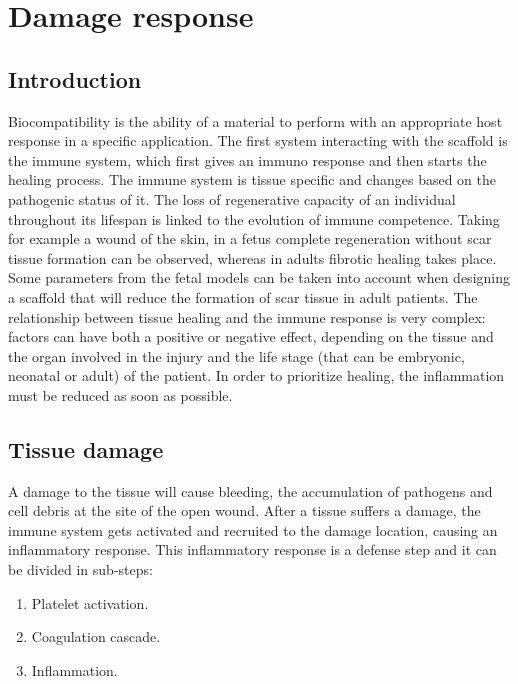 \graphicspath{{chapters/04/images/}}
\chapter{Damage response}

\section{Introduction}
Biocompatibility is the ability of a material to perform with an appropriate host response in a specific application.
The first system interacting with the scaffold is the immune system, which first gives an immuno response and then starts the healing process.
The immune system is tissue specific and changes based on the pathogenic status of it.
The loss of regenerative capacity of an individual throughout its lifespan is linked to the evolution of immune competence.
Taking for example a wound of the skin, in a fetus complete regeneration without scar tissue formation can be observed, whereas in adults fibrotic healing takes place.
Some parameters from the fetal models can be taken into account when designing a scaffold that will reduce the formation of scar tissue in adult patients.
The relationship between tissue healing and the immune response is very complex: factors can have both a positive or negative effect, depending on the tissue and the organ involved in the injury and the life stage (that can be embryonic, neonatal or adult) of the patient.
In order to prioritize healing, the inflammation must be reduced as soon as possible.

\section{Tissue damage}
A damage to the tissue will cause bleeding, the accumulation of pathogens and cell debris at the site of the open wound.
After a tissue suffers a damage, the immune system gets activated and recruited to the damage location, causing an inflammatory response.
This inflammatory response is a defense step and it can be divided in sub-steps:

\begin{multicols}{2}
	\begin{enumerate}
		\item Platelet activation.
		\item Coagulation cascade.
		\item Inflammation.
	\end{enumerate}
\end{multicols}

